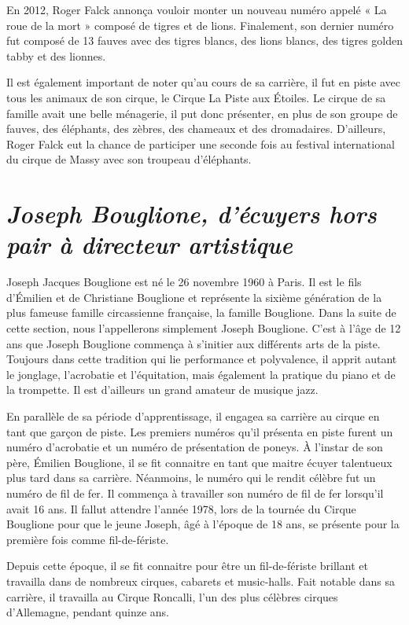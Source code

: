 En 2012, Roger Falck annonça vouloir monter un nouveau numéro appelé « La roue de la mort » composé de tigres et de lions. Finalement, son dernier numéro fut composé de 13 fauves avec des tigres blancs, des lions blancs, des tigres golden tabby et des lionnes.

Il est également important de noter qu’au cours de sa carrière, il fut en piste avec tous les animaux de son cirque, le Cirque La Piste aux Étoiles. Le cirque de sa famille avait une belle ménagerie, il put donc présenter, en plus de son groupe de fauves, des éléphants, des zèbres, des chameaux et des dromadaires. D’ailleurs, Roger Falck eut la chance de participer une seconde fois au festival international du cirque de Massy avec son troupeau d’éléphants.

\section*{\textit{Joseph Bouglione, d’écuyers hors pair à directeur artistique}}
{}
\noindent
Joseph Jacques Bouglione est né le 26 novembre 1960 à Paris. Il est le fils d'Émilien et de Christiane Bouglione et représente la sixième génération de la plus fameuse famille circassienne française, la famille Bouglione. Dans la suite de cette section, nous l’appellerons simplement Joseph Bouglione. C’est à l’âge de 12 ans que Joseph Bouglione commença à s’initier aux différents arts de la piste. Toujours dans cette tradition qui lie performance et polyvalence, il apprit autant le jonglage, l’acrobatie et l’équitation, mais également la pratique du piano et de la trompette. Il est d’ailleurs un grand amateur de musique jazz.

En parallèle de sa période d’apprentissage, il engagea sa carrière au cirque en tant que garçon de piste. Les premiers numéros qu’il présenta en piste furent un numéro d’acrobatie et un numéro de présentation de poneys. À l’instar de son père, Émilien Bouglione, il se fit connaitre en tant que maitre écuyer talentueux plus tard dans sa carrière. Néanmoins, le numéro qui le rendit célèbre fut un numéro de fil de fer. Il commença à travailler son numéro de fil de fer lorsqu’il avait 16 ans. Il fallut attendre l’année 1978, lors de la tournée du Cirque Bouglione pour que le jeune Joseph, âgé à l’époque de 18 ans, se présente pour la première fois comme fil-de-fériste.

Depuis cette époque, il se fit connaitre pour être un fil-de-fériste brillant et travailla dans de nombreux cirques, cabarets et music-halls. Fait notable dans sa carrière, il travailla au Cirque Roncalli, l’un des plus célèbres cirques d’Allemagne, pendant quinze ans.

